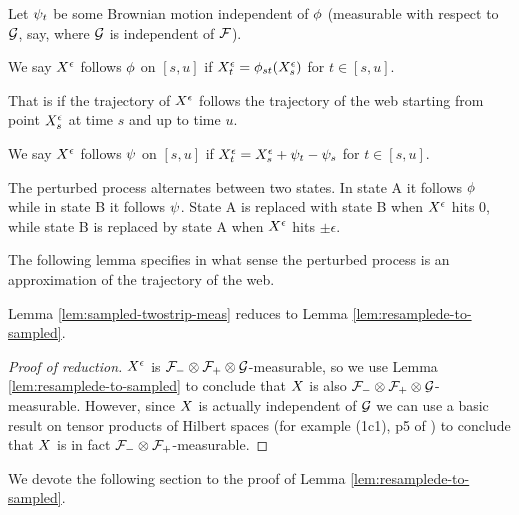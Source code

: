 {{\begin{definition}
  Let $\psi_{t}$ be
  some Brownian motion independent of $\phi$ (measurable with
  respect to $\mathcal{G}$, say, where $\mathcal{G}$ is independent of
  $\mathcal{F}$).

  We say $X^{\epsilon}$ follows $\phi$ on $[s,u]$ if
  $X^{\epsilon}_t = \phi_{{s}{t}}(X^{\epsilon}_s)$ for $t \in [s,u]$.

  That is if the trajectory of $X^{\epsilon}$ follows the trajectory of
  the web starting from point $X^{\epsilon}_s$ at time $s$ and up to time $u$.

  We say $X^{\epsilon}$ follows $\psi$ on $[s,u]$ if
  $X^{\epsilon}_t = X^{\epsilon}_s + \psi_{t} - \psi_{s}$ for $t \in [s,u]$.

  The perturbed process alternates between two states.  In state A it follows 
  $\phi$ while in state B it follows $\psi$. State A is replaced with state B 
  when $X^{\epsilon}$ hits $0$, while state B is replaced by state A when 
  $X^{\epsilon}$ hits $\pm \epsilon$. 
\end{definition}
}

The following lemma specifies in what sense the perturbed process is
an approximation of the trajectory of the web.

\begin{lemma}
  \label{lem:resamplede-to-sampled}
  \statementoflemresampledetosampled
\end{lemma}

Lemma \ref{lem:sampled-twostrip-meas} reduces to Lemma
\ref{lem:resamplede-to-sampled}.

\begin{proof}[Proof of reduction]
  $X^{\epsilon}$ is $\mathcal{F}_{-} \otimes \mathcal{F}_{+} \otimes \mathcal{G}$-measurable, so we use Lemma
  \ref{lem:resamplede-to-sampled} to conclude that $X$ is also
  $\mathcal{F}_{-} \otimes \mathcal{F}_{+} \otimes \mathcal{G}$-measurable.  However, since $X$ is
  actually independent of $\mathcal{G}$ we can use a basic result on
  tensor products of Hilbert spaces (for example (1c1), p5 of
  \cite{tsirelson-completion}) to conclude that $X$ is
  in fact $\mathcal{F}_{-} \otimes \mathcal{F}_{+}$-measurable.
\end{proof}

We devote the following section to the proof of Lemma
\ref{lem:resamplede-to-sampled}.
}
